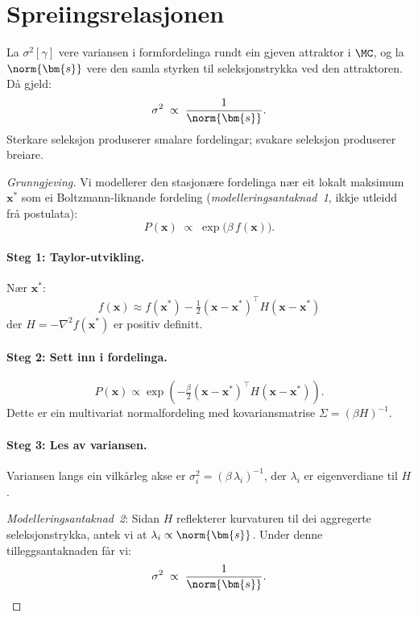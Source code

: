 \section{Spreiingsrelasjonen}

\begin{propmark}[Spreiingsrelasjonen]\label{prop:L.8.4}
La $\sigma^2[\gamma]$ vere variansen i formfordelinga rundt ein
gjeven attraktor i $\MC$, og la $\norm{\bm{s}}$ vere den samla
styrken til seleksjonstrykka ved den attraktoren. Då gjeld:
\[
  \sigma^2 \;\propto\; \frac{1}{\norm{\bm{s}}}.
\]
Sterkare seleksjon produserer smalare fordelingar; svakare
seleksjon produserer breiare.
\end{propmark}

\begin{proof}[Grunngjeving]
Vi modellerer den stasjonære fordelinga nær eit lokalt maksimum
$\bm{x}^*$ som ei Boltzmann-liknande fordeling
(\emph{modelleringsantaknad~1}, ikkje utleidd frå postulata):
\[
  P(\bm{x}) \;\propto\;
  \exp\!\bigl(\beta \, f(\bm{x})\bigr).
\]

\paragraph{Steg 1: Taylor-utvikling.}
Nær $\bm{x}^*$:
\[
  f(\bm{x}) \approx f(\bm{x}^*)
  - \tfrac{1}{2}
  (\bm{x} - \bm{x}^*)^\top H (\bm{x} - \bm{x}^*)
\]
der $H = -\nabla^2 f(\bm{x}^*)$ er positiv definitt.

\paragraph{Steg 2: Sett inn i fordelinga.}
\[
  P(\bm{x}) \propto \exp\!\left(
    -\tfrac{\beta}{2}
    (\bm{x} - \bm{x}^*)^\top H
    (\bm{x} - \bm{x}^*)
  \right).
\]
Dette er ein multivariat normalfordeling med kovariansmatrise
$\Sigma = (\beta H)^{-1}$.

\paragraph{Steg 3: Les av variansen.}
Variansen langs ein vilkårleg akse er
$\sigma_i^2 = (\beta \, \lambda_i)^{-1}$, der $\lambda_i$ er
eigenverdiane til $H$.

\emph{Modelleringsantaknad~2}: Sidan $H$ reflekterer kurvaturen til
dei aggregerte seleksjonstrykka, antek vi at
$\lambda_i \propto \norm{\bm{s}}$. Under denne tilleggsantaknaden
får vi:
\[
  \sigma^2 \;\propto\; \frac{1}{\norm{\bm{s}}}. \qedhere
\]
\end{proof}

